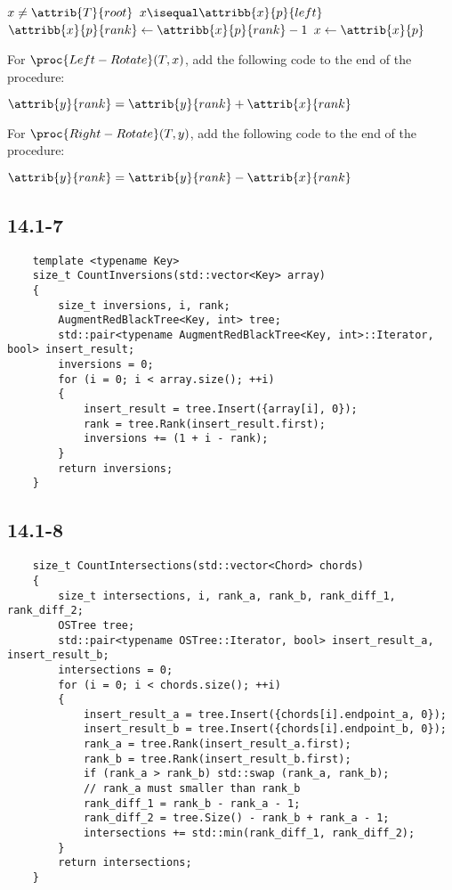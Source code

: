 \begin{codebox}
    \li \While $x \neq \attrib{T}{root}$
    \li \Do
        \If $x \isequal \attribb{x}{p}{left}$
    \li \Then
            $\attribb{x}{p}{rank} \gets \attribb{x}{p}{rank} - 1$
        \End
    \li $x \gets \attrib{x}{p}$
        \End
\end{codebox}

\noindent
For $\proc{Left-Rotate}(T, x)$,
add the following code to the end of the procedure:

\begin{codebox}
    \zi $\attrib{y}{rank} = \attrib{y}{rank} + \attrib{x}{rank}$
\end{codebox}

\noindent
For $\proc{Right-Rotate}(T, y)$,
add the following code to the end of the procedure:

\begin{codebox}
    \zi $\attrib{y}{rank} = \attrib{y}{rank} - \attrib{x}{rank}$
\end{codebox}

\subsection*{14.1-7}

\begin{verbatim}
    template <typename Key>
    size_t CountInversions(std::vector<Key> array)
    {
        size_t inversions, i, rank;
        AugmentRedBlackTree<Key, int> tree;
        std::pair<typename AugmentRedBlackTree<Key, int>::Iterator, bool> insert_result;
        inversions = 0;
        for (i = 0; i < array.size(); ++i)
        {
            insert_result = tree.Insert({array[i], 0});
            rank = tree.Rank(insert_result.first);
            inversions += (1 + i - rank); 
        }
        return inversions;
    }
\end{verbatim}

\subsection*{14.1-8}

\begin{verbatim}
    size_t CountIntersections(std::vector<Chord> chords)
    {
        size_t intersections, i, rank_a, rank_b, rank_diff_1, rank_diff_2;
        OSTree tree;
        std::pair<typename OSTree::Iterator, bool> insert_result_a, insert_result_b;
        intersections = 0;
        for (i = 0; i < chords.size(); ++i)
        {
            insert_result_a = tree.Insert({chords[i].endpoint_a, 0});
            insert_result_b = tree.Insert({chords[i].endpoint_b, 0});
            rank_a = tree.Rank(insert_result_a.first);
            rank_b = tree.Rank(insert_result_b.first);
            if (rank_a > rank_b) std::swap (rank_a, rank_b);
            // rank_a must smaller than rank_b
            rank_diff_1 = rank_b - rank_a - 1;
            rank_diff_2 = tree.Size() - rank_b + rank_a - 1;
            intersections += std::min(rank_diff_1, rank_diff_2); 
        }
        return intersections;
    }
\end{verbatim}


